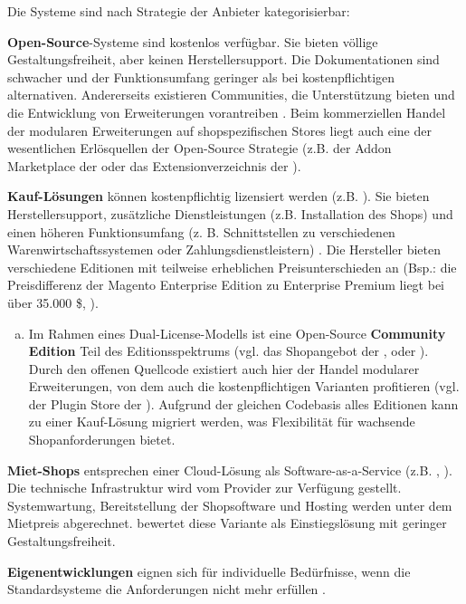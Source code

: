 \documentclass[12pt,a4paper,bibliography=totocnumbered,listof=totoc]{scrartcl}
\begin{document}
Die Systeme sind nach Strategie der Anbieter kategorisierbar:
\begin{compactitem}
\item \textbf{Open-Source}-Systeme sind kostenlos verfügbar. Sie bieten völlige Gestaltungsfreiheit, aber keinen Herstellersupport. Die Dokumentationen sind schwacher und der Funktionsumfang geringer als bei kostenpflichtigen alternativen. Andererseits existieren Communities, die Unterstützung bieten und die Entwicklung von Erweiterungen vorantreiben \citep{stahl15}. Beim kommerziellen Handel der modularen Erweiterungen auf shopspezifischen Stores liegt auch eine der wesentlichen Erlösquellen der Open-Source Strategie (z.B. der Addon Marketplace der \citeauthor{prestashopAddons} oder das Extensionverzeichnis der \citeauthor{opencartExtensions}).
\item \textbf{Kauf-Lösungen} können kostenpflichtig lizensiert werden (z.B. \citeauthor{shopwarePricing}). Sie bieten Herstellersupport, zusätzliche Dienstleistungen (z.B. Installation des Shops) und einen höheren Funktionsumfang (z. B. Schnittstellen zu verschiedenen Warenwirtschaftssystemen oder Zahlungsdienstleistern) \citep{stahl15}. Die Hersteller bieten verschiedene Editionen mit teilweise erheblichen Preisunterschieden an (Bsp.: die Preisdifferenz der Magento Enterprise Edition zu Enterprise Premium liegt bei über 35.000 \$, \citealp[vgl][]{fwpShop}).
\begin{enumerate}[a.]
\item Im Rahmen eines Dual-License-Modells ist eine Open-Source \textbf{Community Edition} Teil des Editionsspektrums \citep{t3n14} (vgl. das Shopangebot der \citeauthor{magentoShops}, \citeauthor{shopwarePricing} oder \citeauthor{oxidShops}). Durch den offenen Quellcode existiert auch hier der Handel modularer Erweiterungen, von dem auch die kostenpflichtigen Varianten profitieren (vgl. der Plugin Store der \citeauthor{shopwarePluginStore}). Aufgrund der gleichen Codebasis alles Editionen kann zu einer Kauf-Lösung migriert werden, was Flexibilität für  wachsende Shopanforderungen bietet.
\end{enumerate}
\item \textbf{Miet-Shops} entsprechen einer Cloud-Lösung als Software-as-a-Service (z.B. \citeauthor{stratoWebshops}, \citeauthor{shopify15}). Die technische Infrastruktur wird vom Provider zur Verfügung gestellt. Systemwartung, Bereitstellung der Shopsoftware und Hosting werden unter dem Mietpreis abgerechnet. \citet{stahl15} bewertet diese Variante als Einstiegslösung mit geringer Gestaltungsfreiheit.
\item \textbf{Eigenentwicklungen} eignen sich für individuelle Bedürfnisse, wenn die Standardsysteme die Anforderungen nicht mehr erfüllen \citep{stahl15, graf14}.
\end{compactitem}
\end{document}
